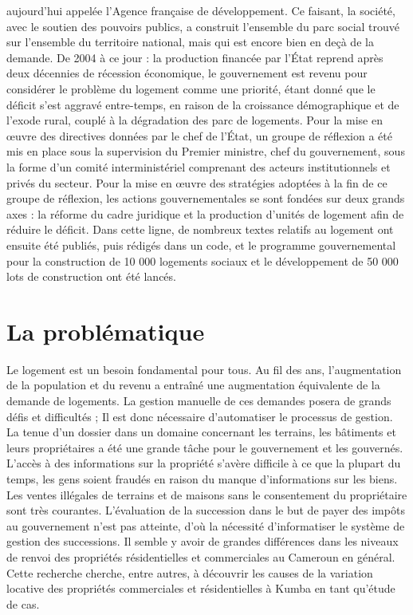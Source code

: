 \documentclass[english,12pt,a4paper]{report}
\begin{document}
aujourd'hui appelée l'Agence française de développement. Ce faisant, la société, avec le soutien des pouvoirs publics, a construit l'ensemble du parc social trouvé sur l'ensemble du territoire national, mais qui est encore bien en deçà de la demande. De 2004 à ce jour : la production financée par l'État reprend après deux décennies de récession économique, le gouvernement est revenu pour considérer le problème du logement comme une priorité, étant donné que le déficit s'est aggravé entre-temps, en raison de la croissance démographique et de l'exode rural, couplé à la dégradation des parc de logements. Pour la mise en œuvre des directives données par le chef de l'État, un groupe de réflexion a été mis en place sous la supervision du Premier ministre, chef du gouvernement, sous la forme d'un comité interministériel comprenant des acteurs institutionnels et privés du secteur. Pour la mise en œuvre des stratégies adoptées à la fin de ce groupe de réflexion, les actions gouvernementales se sont fondées sur deux grands axes : la réforme du cadre juridique et la production d'unités de logement afin de réduire le déficit. Dans cette ligne, de nombreux textes relatifs au logement ont ensuite été publiés, puis rédigés dans un code, et le programme gouvernemental pour la construction de 10 000 logements sociaux et le développement de 50 000 lots de construction ont été lancés. 

\section{La problématique}
Le logement est un besoin fondamental pour tous. Au fil des ans, l'augmentation de la population et du revenu a entraîné une augmentation équivalente de la demande de logements. La gestion manuelle de ces demandes posera de grands défis et difficultés ; Il est donc nécessaire d'automatiser le processus de gestion. La tenue d'un dossier dans un domaine concernant les terrains, les bâtiments et leurs propriétaires a été une grande tâche pour le gouvernement et les gouvernés. L'accès à des informations sur la propriété s'avère difficile à ce que la plupart du temps, les gens soient fraudés en raison du manque d'informations sur les biens. Les ventes illégales de terrains et de maisons sans le consentement du propriétaire sont très courantes. L'évaluation de la succession dans le but de payer des impôts au gouvernement n'est pas atteinte, d'où la nécessité d'informatiser le système de gestion des successions. Il semble y avoir de grandes différences dans les niveaux de renvoi des propriétés résidentielles et commerciales au Cameroun en général. Cette recherche cherche, entre autres, à découvrir les causes de la variation locative des propriétés commerciales et résidentielles à Kumba en tant qu'étude de cas. 
\end{document}
